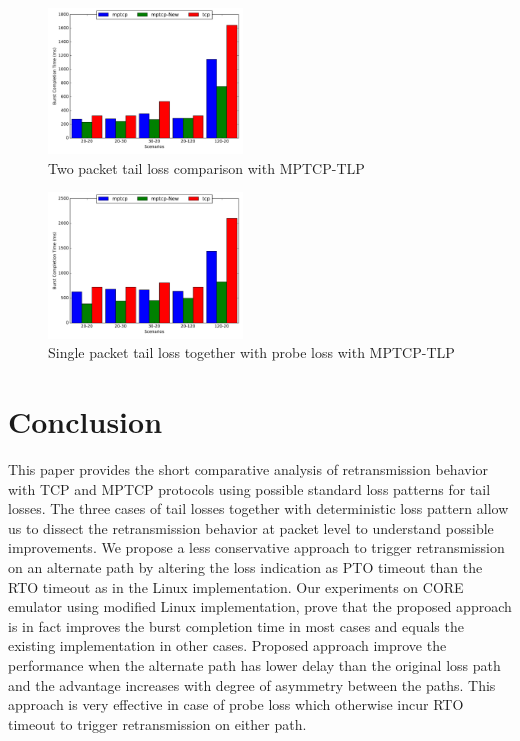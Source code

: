 \documentclass[10pt,draftcls,twocolumn]{IEEEconf}
\begin{document}
\begin{figure}[!ht]
\begin{center}
\includegraphics[angle=0, width=0.46\textwidth, natwidth=578.16,natheight=433.62]{plots/2PNew.pdf}
\caption{Two packet tail loss comparison with MPTCP-TLP}\label{2pn}
\end{center}
\end{figure}

\begin{figure}[!ht]
\begin{center}
\includegraphics[angle=0, width=0.46\textwidth, natwidth=578.16,natheight=433.62]{plots/1PPNew.pdf}
\caption{Single packet tail loss together with probe loss with MPTCP-TLP}\label{1ppn}
\end{center}
\end{figure}


\section{Conclusion}\label{conc}
This paper provides the short comparative analysis of retransmission behavior with TCP and MPTCP protocols using possible standard loss patterns for tail losses.
The three cases of tail losses together with deterministic loss pattern allow us to dissect the retransmission behavior at packet level to understand possible improvements.
We propose a less conservative approach to trigger retransmission on an alternate path by altering the loss indication as PTO timeout than the RTO timeout as in the Linux implementation.
Our experiments on CORE emulator using  modified Linux implementation, prove that the proposed approach is in fact improves the burst completion time in most cases and equals the existing
implementation in other cases. Proposed approach improve the performance when the alternate path has lower delay than the original loss path and the advantage increases with degree of asymmetry between the paths. This approach is very effective in case of probe loss which otherwise incur RTO timeout to trigger retransmission on either path.    
   


\end{document}
